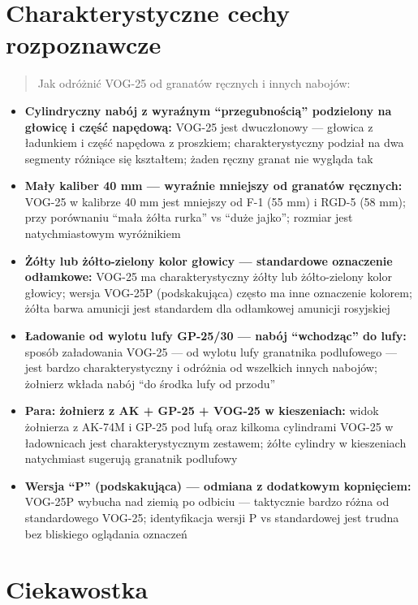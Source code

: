 \documentclass[12pt,openany,oneside]{book}
\providecommand{\tightlist}{%
  \setlength{\itemsep}{0pt}\setlength{\parskip}{0pt}}
\begin{document}
\section{Charakterystyczne cechy
rozpoznawcze}\label{charakterystyczne-cechy-rozpoznawcze-106}

\begin{quote}
Jak odróżnić VOG-25 od granatów ręcznych i innych nabojów:
\end{quote}

\begin{itemize}
\tightlist
\item
  \textbf{Cylindryczny nabój z wyraźnym ``przegubnością'' podzielony na
  głowicę i część napędową:} VOG-25 jest dwuczłonowy --- głowica z
  ładunkiem i część napędowa z proszkiem; charakterystyczny podział na
  dwa segmenty różniące się kształtem; żaden ręczny granat nie wygląda
  tak
\item
  \textbf{Mały kaliber 40 mm --- wyraźnie mniejszy od granatów
  ręcznych:} VOG-25 w kalibrze 40 mm jest mniejszy od F-1 (55 mm) i
  RGD-5 (58 mm); przy porównaniu ``mała żółta rurka'' vs ``duże jajko'';
  rozmiar jest natychmiastowym wyróżnikiem
\item
  \textbf{Żółty lub żółto-zielony kolor głowicy --- standardowe
  oznaczenie odłamkowe:} VOG-25 ma charakterystyczny żółty lub
  żółto-zielony kolor głowicy; wersja VOG-25P (podskakująca) często ma
  inne oznaczenie kolorem; żółta barwa amunicji jest standardem dla
  odłamkowej amunicji rosyjskiej
\item
  \textbf{Ładowanie od wylotu lufy GP-25/30 --- nabój ``wchodząc'' do
  lufy:} sposób załadowania VOG-25 --- od wylotu lufy granatnika
  podlufowego --- jest bardzo charakterystyczny i odróżnia od wszelkich
  innych nabojów; żołnierz wkłada nabój ``do środka lufy od przodu''
\item
  \textbf{Para: żołnierz z AK + GP-25 + VOG-25 w kieszeniach:} widok
  żołnierza z AK-74M i GP-25 pod lufą oraz kilkoma cylindrami VOG-25 w
  ładownicach jest charakterystycznym zestawem; żółte cylindry w
  kieszeniach natychmiast sugerują granatnik podlufowy
\item
  \textbf{Wersja ``P'' (podskakująca) --- odmiana z dodatkowym
  kopnięciem:} VOG-25P wybucha nad ziemią po odbiciu --- taktycznie
  bardzo różna od standardowego VOG-25; identyfikacja wersji P vs
  standardowej jest trudna bez bliskiego oglądania oznaczeń
\end{itemize}

\section{Ciekawostka}\label{ciekawostka-106}
\end{document}
